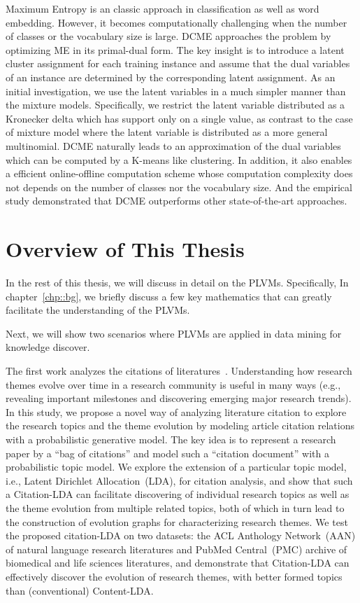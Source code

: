 Maximum Entropy is an classic approach in classification as well as word
embedding. However, it becomes computationally challenging when the number of
classes or the vocabulary size is large. DCME approaches the problem by
optimizing ME in its primal-dual form. The key insight is to introduce a latent
cluster assignment for each training instance and assume that the dual variables
of an instance are determined by the corresponding latent assignment. As an
initial investigation, we use the latent variables in a much simpler manner than
the mixture models. Specifically, we restrict the latent variable distributed as
a Kronecker delta which has support only on a single value, as contrast to the
case of mixture model where the latent variable is distributed as a more general
multinomial. DCME naturally leads to an approximation of the dual variables
which can be computed by a K-means like clustering. In addition, it also enables
a efficient online-offline computation scheme whose computation complexity does
not depends on the number of classes nor the vocabulary size. And the empirical
study demonstrated that DCME outperforms other state-of-the-art approaches.

\section{Overview of This Thesis}

In the rest of this thesis, we will discuss in detail on the PLVMs.
Specifically,  In chapter~\ref{chp::bg}, we briefly discuss a few key
mathematics that can greatly facilitate the understanding of the PLVMs.

Next, we will show two scenarios where PLVMs are applied in data mining for
knowledge discover.

The first work analyzes the citations of
literatures~\cite{wang2013understanding}. Understanding how research themes
evolve over time in a research community is useful in many ways (e.g., revealing
important milestones and discovering emerging major research trends).  In this
study, we propose a novel way of analyzing literature citation to explore the
research topics and the theme evolution by modeling article citation relations
with a probabilistic generative model.  The key idea is to represent a research
paper by a ``bag of citations'' and model such a ``citation document'' with a
probabilistic topic model.  We explore the extension of a particular topic
model, i.e., Latent Dirichlet Allocation~(LDA), for citation analysis, and show
that such a Citation-LDA can facilitate discovering of individual research
topics as well as the theme evolution from multiple related topics, both of
which in turn lead to the construction of evolution graphs for characterizing
research themes.  We test the proposed citation-LDA on two datasets: the ACL
Anthology Network~(AAN) of natural language research literatures and PubMed
Central~(PMC) archive of biomedical and life sciences literatures, and
demonstrate that Citation-LDA can effectively discover the evolution of research
themes, with better formed topics than (conventional) Content-LDA.

